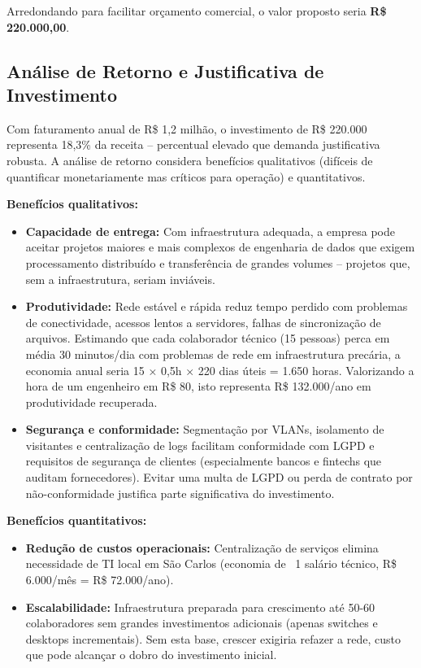 \documentclass[12pt,a4paper]{article}
\begin{document}
Arredondando para facilitar orçamento comercial, o valor proposto seria \textbf{R\$ 220.000,00}.

\subsection{Análise de Retorno e Justificativa de Investimento}

Com faturamento anual de R\$ 1,2 milhão, o investimento de R\$ 220.000 representa 18,3\% da receita -- percentual elevado que demanda justificativa robusta. A análise de retorno considera benefícios qualitativos (difíceis de quantificar monetariamente mas críticos para operação) e quantitativos.

\textbf{Benefícios qualitativos:}
\begin{itemize}
    \item \textbf{Capacidade de entrega:} Com infraestrutura adequada, a empresa pode aceitar projetos maiores e mais complexos de engenharia de dados que exigem processamento distribuído e transferência de grandes volumes -- projetos que, sem a infraestrutura, seriam inviáveis.
    \item \textbf{Produtividade:} Rede estável e rápida reduz tempo perdido com problemas de conectividade, acessos lentos a servidores, falhas de sincronização de arquivos. Estimando que cada colaborador técnico (15 pessoas) perca em média 30 minutos/dia com problemas de rede em infraestrutura precária, a economia anual seria 15 × 0,5h × 220 dias úteis = 1.650 horas. Valorizando a hora de um engenheiro em R\$ 80, isto representa R\$ 132.000/ano em produtividade recuperada.
    \item \textbf{Segurança e conformidade:} Segmentação por VLANs, isolamento de visitantes e centralização de logs facilitam conformidade com LGPD e requisitos de segurança de clientes (especialmente bancos e fintechs que auditam fornecedores). Evitar uma multa de LGPD ou perda de contrato por não-conformidade justifica parte significativa do investimento.
\end{itemize}

\textbf{Benefícios quantitativos:}
\begin{itemize}
    \item \textbf{Redução de custos operacionais:} Centralização de serviços elimina necessidade de TI local em São Carlos (economia de ~1 salário técnico, R\$ 6.000/mês = R\$ 72.000/ano).
    \item \textbf{Escalabilidade:} Infraestrutura preparada para crescimento até 50-60 colaboradores sem grandes investimentos adicionais (apenas switches e desktops incrementais). Sem esta base, crescer exigiria refazer a rede, custo que pode alcançar o dobro do investimento inicial.
\end{itemize}
\end{document}

